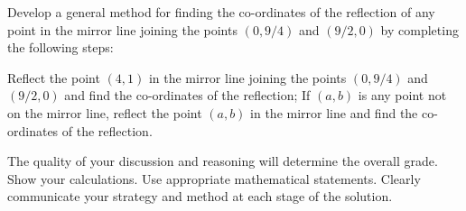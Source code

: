Develop a general method for finding the co-ordinates of the reflection of any point in the mirror line joining the points $ (0, 9/4) $ and $ (9/2, 0) $ by
completing the following steps:
\begin{questions}
  \question Reflect the point $ (4, 1) $ in the mirror line joining the points $ (0, 9/4) $ and $ (9/2, 0) $ and find the co-ordinates of the reflection;
  \question If $ (a, b) $ is any point not on the mirror line, reflect the point $ (a, b) $ in the mirror line and find the co-ordinates of the reflection.
\end{questions}

The quality of your discussion and reasoning will determine the overall grade. Show your calculations. Use appropriate mathematical statements. Clearly
communicate your strategy and method at each stage of the solution.

